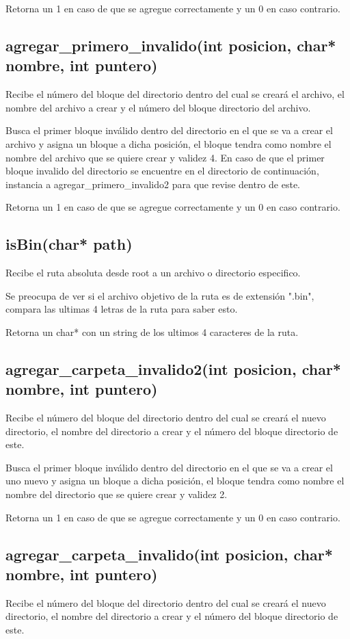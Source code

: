 \documentclass[12pt]{article}
\begin{document}
Retorna un 1 en caso de que se agregue correctamente y un 0 en caso contrario.


\subsection{agregar\_primero\_invalido(int posicion, char* nombre, int puntero)}
Recibe el número del bloque del directorio dentro del cual se creará el archivo, el nombre del archivo a crear y el número del bloque directorio del archivo.

Busca el primer bloque inválido dentro del directorio en el que se va a crear el archivo y asigna un bloque a dicha posición, el bloque tendra como nombre el nombre del archivo que se quiere crear y validez 4. En caso de que el primer bloque invalido del directorio se encuentre en el directorio de continuación, instancia a agregar\_primero\_invalido2 para que revise dentro de este.

Retorna un 1 en caso de que se agregue correctamente y un 0 en caso contrario.

\subsection{isBin(char* path)}
Recibe el ruta absoluta desde root a un archivo o directorio especifico.

Se preocupa de ver si el archivo objetivo de la ruta es de extensión ".bin", compara las ultimas 4 letras de la ruta para saber esto.

Retorna un char* con un string de los ultimos 4 caracteres de la ruta.

\subsection{agregar\_carpeta\_invalido2(int posicion, char* nombre, int puntero)}
Recibe el número del bloque del directorio dentro del cual se creará el nuevo directorio, el nombre del directorio a crear y el número del bloque directorio de este.

Busca el primer bloque inválido dentro del directorio en el que se va a crear el uno nuevo y asigna un bloque a dicha posición, el bloque tendra como nombre el nombre del directorio que se quiere crear y validez 2.

Retorna un 1 en caso de que se agregue correctamente y un 0 en caso contrario.


\subsection{agregar\_carpeta\_invalido(int posicion, char* nombre, int puntero)}
Recibe el número del bloque del directorio dentro del cual se creará el nuevo directorio, el nombre del directorio a crear y el número del bloque directorio de este.
\end{document}
